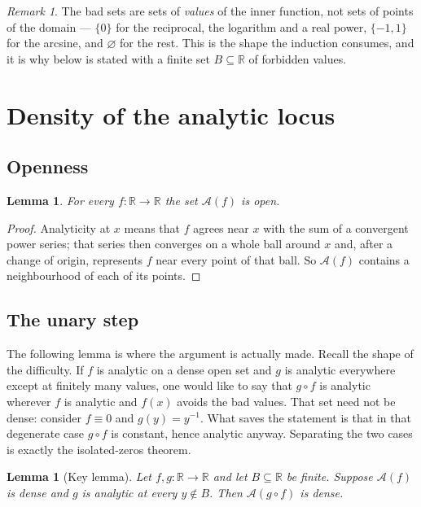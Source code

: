 \documentclass[11pt,oneside]{article}
\newtheorem{lemma}[theorem]{Lemma}
\theoremstyle{definition}
\theoremstyle{remark}
\newtheorem{remark}[theorem]{Remark}
\newcommand{\R}{\mathbb R}
\newcommand{\An}{\mathcal A}
\begin{document}
\begin{remark}
The bad sets are sets of \emph{values} of the inner function, not sets of
points of the domain --- $\{0\}$ for the reciprocal, the logarithm and a real
power, $\{-1,1\}$ for the arcsine, and $\varnothing$ for the rest.  This is
the shape the induction consumes, and it is why  below is stated
with a finite set $B\subseteq\R$ of forbidden values.
\end{remark}

\section{Density of the analytic locus}

\subsection{Openness}

\begin{lemma}\label{lem:open}
For every $f\colon\R\to\R$ the set $\An(f)$ is open.
\end{lemma}

\begin{proof}
Analyticity at $x$ means that $f$ agrees near $x$ with the sum of a
convergent power series; that series then converges on a whole ball around
$x$ and, after a change of origin, represents $f$ near every point of that
ball.  So $\An(f)$ contains a neighbourhood of each of its points.
\end{proof}

\subsection{The unary step}

The following lemma is where the argument is actually made.  Recall the shape
of the difficulty.  If $f$ is analytic on a dense open set and $g$ is analytic
everywhere except at finitely many values, one would like to say that
$g\circ f$ is analytic wherever $f$ is analytic and $f(x)$ avoids the bad
values.  That set need not be dense: consider $f\equiv 0$ and $g(y)=y^{-1}$.
What saves the statement is that in that degenerate case $g\circ f$ is
constant, hence analytic anyway.  Separating the two cases is exactly the
isolated-zeros theorem.

\begin{lemma}[Key lemma]\label{lem:key}
Let $f,g\colon\R\to\R$ and let $B\subseteq\R$ be finite.  Suppose $\An(f)$ is
dense and $g$ is analytic at every $y\notin B$.  Then $\An(g\circ f)$ is
dense.
\end{lemma}
\end{document}
